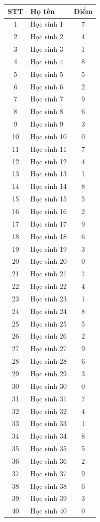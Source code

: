 \documentclass[12pt]{article}
\begin{document}
\begin{longtable}{|c|l|c|}
\hline
STT & Họ tên & Điểm \\ \hline
\endhead
1 & Học sinh 1 & 7 \\ \hline
2 & Học sinh 2 & 4 \\ \hline
3 & Học sinh 3 & 1 \\ \hline
4 & Học sinh 4 & 8 \\ \hline
5 & Học sinh 5 & 5 \\ \hline
6 & Học sinh 6 & 2 \\ \hline
7 & Học sinh 7 & 9 \\ \hline
8 & Học sinh 8 & 6 \\ \hline
9 & Học sinh 9 & 3 \\ \hline
10 & Học sinh 10 & 0 \\ \hline
11 & Học sinh 11 & 7 \\ \hline
12 & Học sinh 12 & 4 \\ \hline
13 & Học sinh 13 & 1 \\ \hline
14 & Học sinh 14 & 8 \\ \hline
15 & Học sinh 15 & 5 \\ \hline
16 & Học sinh 16 & 2 \\ \hline
17 & Học sinh 17 & 9 \\ \hline
18 & Học sinh 18 & 6 \\ \hline
19 & Học sinh 19 & 3 \\ \hline
20 & Học sinh 20 & 0 \\ \hline
21 & Học sinh 21 & 7 \\ \hline
22 & Học sinh 22 & 4 \\ \hline
23 & Học sinh 23 & 1 \\ \hline
24 & Học sinh 24 & 8 \\ \hline
25 & Học sinh 25 & 5 \\ \hline
26 & Học sinh 26 & 2 \\ \hline
27 & Học sinh 27 & 9 \\ \hline
28 & Học sinh 28 & 6 \\ \hline
29 & Học sinh 29 & 3 \\ \hline
30 & Học sinh 30 & 0 \\ \hline
31 & Học sinh 31 & 7 \\ \hline
32 & Học sinh 32 & 4 \\ \hline
33 & Học sinh 33 & 1 \\ \hline
34 & Học sinh 34 & 8 \\ \hline
35 & Học sinh 35 & 5 \\ \hline
36 & Học sinh 36 & 2 \\ \hline
37 & Học sinh 37 & 9 \\ \hline
38 & Học sinh 38 & 6 \\ \hline
39 & Học sinh 39 & 3 \\ \hline
40 & Học sinh 40 & 0 \\ \hline
\end{longtable}
\end{document}
